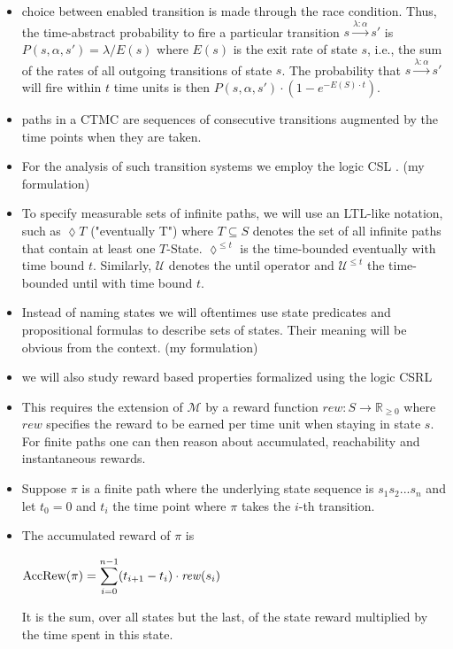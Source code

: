 \documentclass[a4paper, 10pt]{article}
\begin{document}
\begin{enumerate}
\begin{itemize}
	\item choice between enabled transition is made through the race condition. Thus, the time-abstract probability to fire a particular transition $s \xrightarrow{\lambda : \alpha} s'$ is $P(s, \alpha, s') = \lambda / E(s)$ where $E(s)$ is the exit rate of state $s$, i.e., the sum of the rates of all outgoing transitions of state $s$. The probability that $s \xrightarrow{\lambda : \alpha} s'$ will fire within $t$ time units is then $P(s, \alpha, s') \cdot (1 - e^{- E(S) \cdot t})$.
	\item paths in a CTMC are sequences of consecutive transitions augmented by the time points when they are taken.
	\item For the analysis of such transition systems we employ the logic CSL \cite{assb96, bhhk00}. (my formulation)
	\item To specify measurable sets of infinite paths, we will use an LTL-like notation, such as $\lozenge T$ ("eventually T") where $T \subseteq S$ denotes the set of all infinite paths that contain at least one $T$-State. $\lozenge^{\le t}$ is the time-bounded eventually with time bound $t$. Similarly, $\mathcal{U}$ denotes the until operator and $\mathcal{U}^{\le t}$ the time-bounded until with time bound $t$.
	\item Instead of naming states we will oftentimes use state predicates and propositional formulas to describe sets of states. Their meaning will be obvious from the context. (my formulation)
	\item we will also study reward based properties formalized using the logic CSRL \cite{bhhk00}
	\item This requires the extension of $\mathcal{M}$ by a reward function $\mathit{rew} : S \rightarrow \mathbb{R}_{\ge 0}$ where $\mathit{rew}$ specifies the reward to be earned per time  unit when staying in state $s$. For finite paths one can then reason about accumulated, reachability and instantaneous rewards.
	\item Suppose $\pi$ is a finite path where the underlying state sequence is $s_1 s_2 ...s_n$ and let $t_0 = 0$ and $t_i$ the time point where $\pi$ takes the $i$-th transition.
	\item The accumulated reward of $\pi$ is
		\begin{center}
			$\mathrm{AccRew}(\pi) = \mathlarger{\sum}\limits_{i=0}^{n-1} (t_{i+1} - t_i) \cdot \mathit{rew}(s_i)$
		\end{center}
		It is the sum, over all states but the last, of the state reward multiplied by the time spent in this state.

\end{itemize}
\end{enumerate}
\end{document}
